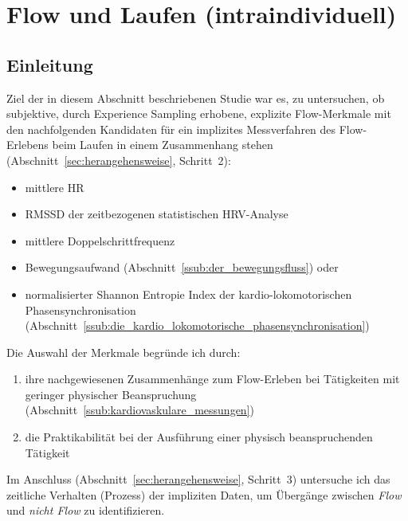 

\section{Flow und Laufen (intraindividuell)} 

\label{sec:flow_und_laufen_intraindividuell}

\subsection{Einleitung} 

\label{sub:einleitung_5_1}

Ziel der in diesem Abschnitt beschriebenen Studie war es, zu untersuchen, ob subjektive, durch Experience Sampling erhobene, explizite Flow-Merkmale mit den nachfolgenden Kandidaten für ein implizites Messverfahren des Flow-Erlebens beim Laufen in einem Zusammenhang stehen (Abschnitt~\ref{sec:herangehensweise}, Schritt~2): 
\begin{itemize}
	\item mittlere \ac{HR} 
	\item \acs{RMSSD} der zeitbezogenen statistischen \ac{HRV}-Analyse 
	\item mittlere Doppelschrittfrequenz 
	\item Bewegungsaufwand (Abschnitt~\ref{ssub:der_bewegungsfluss}) oder 
	\item normalisierter Shannon Entropie Index der kardio-lokomotorischen Phasensynchronisation (Abschnitt~\ref{ssub:die_kardio_lokomotorische_phasensynchronisation}) 
\end{itemize}

Die Auswahl der Merkmale begründe ich durch: 
\begin{enumerate}
	\item ihre nachgewiesenen Zusammenhänge zum Flow-Erleben bei Tätigkeiten mit geringer physischer Beanspruchung (Abschnitt~\ref{ssub:kardiovaskulare_messungen}) 
	\item die Praktikabilität bei der Ausführung einer physisch beanspruchenden Tätigkeit 
\end{enumerate}

Im Anschluss (Abschnitt~\ref{sec:herangehensweise}, Schritt~3) untersuche ich das zeitliche Verhalten (Prozess) der impliziten Daten, um Übergänge zwischen \emph{Flow} und \emph{nicht Flow} zu identifizieren.

